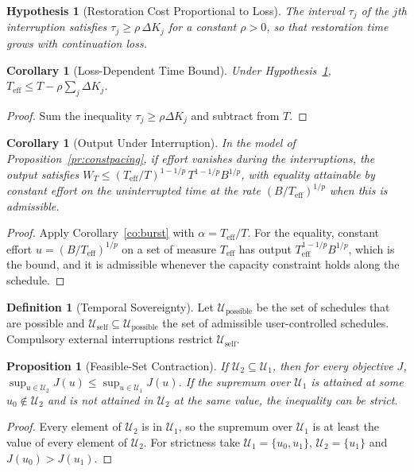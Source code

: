 \documentclass[11pt,letterpaper]{report}
\theoremstyle{plain}
\newtheorem{proposition}[theorem]{Proposition}
\newtheorem{corollary}[theorem]{Corollary}
\newtheorem{hypothesis}[theorem]{Hypothesis}
\theoremstyle{definition}
\newtheorem{definition}[theorem]{Definition}
\theoremstyle{remark}
\begin{document}
\begin{hypothesis}[Restoration Cost Proportional to Loss]\label{hy:restoration}
The interval $\tau_j$ of the $j$th interruption satisfies $\tau_j\ge\rho\,\Delta K_j$ for a constant $\rho>0$, so that restoration time grows with continuation loss.
\end{hypothesis}

\begin{corollary}[Loss-Dependent Time Bound]\label{co:lossbound}
Under Hypothesis~\ref{hy:restoration}, $T_{\mathrm{eff}}\le T-\rho\sum_j\Delta K_j$.
\end{corollary}
\begin{proof}
Sum the inequality $\tau_j\ge\rho\Delta K_j$ and subtract from $T$.
\end{proof}

\begin{corollary}[Output Under Interruption]\label{co:outputinterrupt}
In the model of Proposition~\ref{pr:constpacing}, if effort vanishes during the interruptions, the output satisfies $W_T\le(T_{\mathrm{eff}}/T)^{1-1/p}\,T^{1-1/p}B^{1/p}$, with equality attainable by constant effort on the uninterrupted time at the rate $(B/T_{\mathrm{eff}})^{1/p}$ when this is admissible.
\end{corollary}
\begin{proof}
Apply Corollary~\ref{co:burst} with $\alpha=T_{\mathrm{eff}}/T$. For the equality, constant effort $u=(B/T_{\mathrm{eff}})^{1/p}$ on a set of measure $T_{\mathrm{eff}}$ has output $T_{\mathrm{eff}}^{1-1/p}B^{1/p}$, which is the bound, and it is admissible whenever the capacity constraint holds along the schedule.
\end{proof}

\begin{definition}[Temporal Sovereignty]\label{def:sovereignty}
Let $\mathcal U_{\mathrm{possible}}$ be the set of schedules that are possible and $\mathcal U_{\mathrm{self}}\subseteq\mathcal U_{\mathrm{possible}}$ the set of admissible user-controlled schedules. Compulsory external interruptions restrict $\mathcal U_{\mathrm{self}}$.
\end{definition}

\begin{proposition}[Feasible-Set Contraction]\label{pr:contraction}
If $\mathcal U_2\subseteq\mathcal U_1$, then for every objective $J$, $\sup_{u\in\mathcal U_2}J(u)\le\sup_{u\in\mathcal U_1}J(u)$. If the supremum over $\mathcal U_1$ is attained at some $u_0\notin\mathcal U_2$ and is not attained in $\mathcal U_2$ at the same value, the inequality can be strict.
\end{proposition}
\begin{proof}
Every element of $\mathcal U_2$ is in $\mathcal U_1$, so the supremum over $\mathcal U_1$ is at least the value of every element of $\mathcal U_2$. For strictness take $\mathcal U_1=\{u_0,u_1\}$, $\mathcal U_2=\{u_1\}$ and $J(u_0)>J(u_1)$.
\end{proof}
\end{document}
